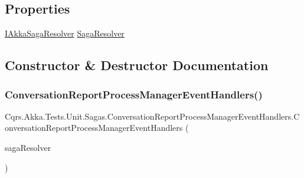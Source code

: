 \subsection*{Properties}
\begin{DoxyCompactItemize}
\item 
\hyperlink{interfaceCqrs_1_1Akka_1_1Domain_1_1IAkkaSagaResolver}{I\+Akka\+Saga\+Resolver} \hyperlink{classCqrs_1_1Akka_1_1Tests_1_1Unit_1_1Sagas_1_1ConversationReportProcessManagerEventHandlers_ab9316a7764bc962834f03fa32cd1fe28_ab9316a7764bc962834f03fa32cd1fe28}{Saga\+Resolver}
\end{DoxyCompactItemize}


\subsection{Constructor \& Destructor Documentation}
\mbox{\label{classCqrs_1_1Akka_1_1Tests_1_1Unit_1_1Sagas_1_1ConversationReportProcessManagerEventHandlers_a0b35d652189d6194ff5893ff114293e0_a0b35d652189d6194ff5893ff114293e0}} 
\subsubsection{\texorpdfstring{Conversation\+Report\+Process\+Manager\+Event\+Handlers()}{ConversationReportProcessManagerEventHandlers()}}
{\footnotesize\ttfamily Cqrs.\+Akka.\+Tests.\+Unit.\+Sagas.\+Conversation\+Report\+Process\+Manager\+Event\+Handlers.\+Conversation\+Report\+Process\+Manager\+Event\+Handlers (\begin{DoxyParamCaption}\item[{\hyperlink{interfaceCqrs_1_1Akka_1_1Domain_1_1IAkkaSagaResolver}{I\+Akka\+Saga\+Resolver}}]{saga\+Resolver }\end{DoxyParamCaption})}



